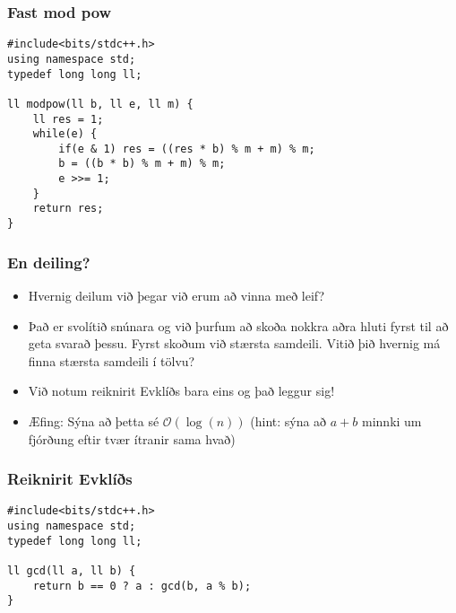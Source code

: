 \documentclass{beamer}
\begin{document}
\begin{frame}[fragile]
\frametitle{Fast mod pow}

\begin{verbatim}
#include<bits/stdc++.h>
using namespace std;
typedef long long ll;

ll modpow(ll b, ll e, ll m) {
    ll res = 1;
    while(e) {
        if(e & 1) res = ((res * b) % m + m) % m;
        b = ((b * b) % m + m) % m;
        e >>= 1;
    }
    return res;
}
\end{verbatim}

\end{frame}

\begin{frame}
\frametitle{En deiling?}

\begin{itemize}

\item<1-> Hvernig deilum við þegar við erum að vinna með leif?

\item<2-> Það er svolítið snúnara og við þurfum að skoða nokkra aðra hluti fyrst til að geta svarað þessu. Fyrst skoðum við stærsta samdeili. Vitið þið hvernig má finna stærsta samdeili í tölvu?

\item<3-> Við notum reiknirit Evklíðs bara eins og það leggur sig! 

\item<4-> Æfing: Sýna að þetta sé $\mathcal{O}(\log(n))$ (hint: sýna að $a + b$ minnki um fjórðung eftir tvær ítranir sama hvað)

\end{itemize}

\end{frame}

\begin{frame}[fragile]
\frametitle{Reiknirit Evklíðs}

\begin{verbatim}
#include<bits/stdc++.h>
using namespace std;
typedef long long ll;

ll gcd(ll a, ll b) { 
    return b == 0 ? a : gcd(b, a % b); 
}
\end{verbatim}

\end{frame}
\end{document}
